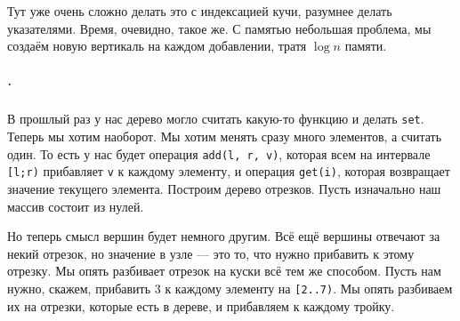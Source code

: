 \documentclass{article}
\newcommand{\pseudo}{PseudoLexer.py:PseudoLexer -x}
\newcommand{\pseudocode}[1]{\texttt{#1}}
\begin{document}
    Тут уже очень сложно делать это с индексацией кучи, разумнее делать указателями. Время, очевидно, такое же. С памятью небольшая проблема, мы создаём новую вертикаль на каждом добавлении, тратя $\log n$ памяти.
    \subparagraph{.}
    В прошлый раз у нас дерево могло считать какую-то функцию и делать \pseudocode{set}. Теперь мы хотим наоборот. Мы хотим менять сразу много элементов, а считать один. То есть у нас будет операция \pseudocode{add(l, r, v)}, которая всем на интервале \pseudocode{[l;r)} прибавляет \pseudocode{v} к каждому элементу, и операция \pseudocode{get(i)}, которая возвращает значение текущего элемента. Построим дерево отрезков. Пусть изначально наш массив состоит из нулей.
    \begin{center}
    \end{center}
    Но теперь смысл вершин будет немного другим. Всё ещё вершины отвечают за некий отрезок, но значение в узле --- это то, что нужно прибавить к этому отрезку. Мы опять разбивает отрезок на куски всё тем же способом. Пусть нам нужно, скажем, прибавить 3 к каждому элементу на \pseudocode{[2..7)}. Мы опять разбиваем их на отрезки, которые есть в дереве, и прибавляем к каждому тройку.
\end{document}

